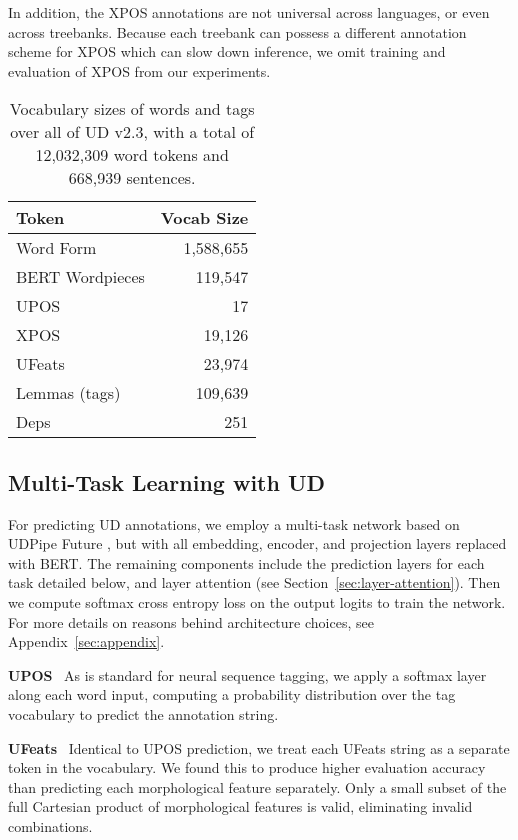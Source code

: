 \documentclass[11pt,a4paper]{article}
\begin{document}
In addition, the XPOS annotations are not universal across languages, or even across treebanks.
Because each treebank can possess a different annotation scheme for XPOS which can slow down inference, we omit training and evaluation of XPOS from our experiments.

\begin{table}[tbp]
    \small
    \begin{center}
    \begin{tabular}{@{}lr@{}}
    \toprule
        \sc Token & \sc Vocab Size \\
    \midrule
        Word Form & 1,588,655 \\
        BERT Wordpieces & 119,547 \\
        UPOS & 17 \\
        XPOS & 19,126 \\
        UFeats & 23,974 \\
        Lemmas (tags) & 109,639 \\
        Deps & 251 \\
    \bottomrule
    \end{tabular}
    \end{center}
    \caption{\label{table:vocab-size} 
        Vocabulary sizes of words and tags over all of UD v2.3, with a total of 12,032,309 word tokens and 668,939 sentences.
    }
\end{table}

\subsection{Multi-Task Learning with UD} \label{sec:multi-task-learning-ud}

For predicting UD annotations, we employ a multi-task network based on UDPipe Future \cite{straka:2018:K18-2}, but with all embedding, encoder, and projection layers replaced with BERT.
The remaining components include the prediction layers for each task detailed below, and layer attention (see Section~\ref{sec:layer-attention}).
Then we compute softmax cross entropy loss on the output logits to train the network.
For more details on reasons behind architecture choices, see Appendix~\ref{sec:appendix}.

{\bf UPOS} \, As is standard for neural sequence tagging, we apply a softmax layer along each word input, computing a probability distribution over the tag vocabulary to predict the annotation string.

{\bf UFeats} \, Identical to UPOS prediction, we treat each UFeats string as a separate token in the vocabulary.
We found this to produce higher evaluation accuracy than predicting each morphological feature separately.
Only a small subset of the full Cartesian product of morphological features is valid, eliminating invalid combinations.\\
\end{document}
